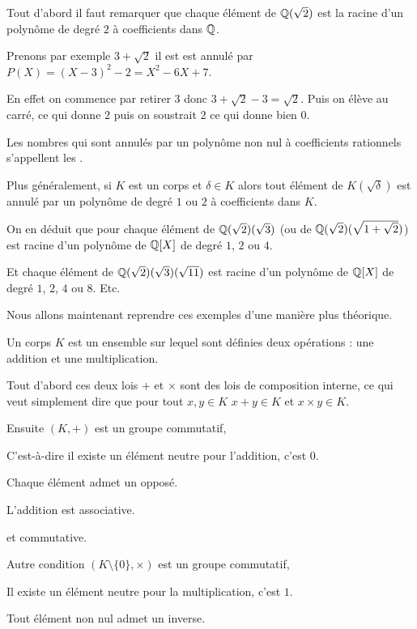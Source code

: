 \change
Tout d'abord il faut remarquer que chaque élément de $\mathbb{Q}(\sqrt 2)$ est la racine d'un polynôme de degré $2$
à coefficients dans $\mathbb{Q}$. 

\change
Prenons par exemple $3+\sqrt 2$ il est est annulé par 
$P(X) = (X-3)^2 -2 = X^2-6X+7$.

En effet on commence par retirer $3$ donc $3+\sqrt 2-3 = \sqrt 2$.
Puis on élève au carré, ce qui donne $2$ puis on soustrait $2$ ce qui donne bien $0$.

\change
Les nombres qui sont annulés par un polynôme non nul à coefficients rationnels s'appellent 
les 
.

\change
Plus généralement, si $K$ est un corps et $\delta \in K$ alors tout élément de $K(\sqrt \delta)$
est annulé par un polynôme de degré $1$ ou $2$ à coefficients dans $K$.

\change
On en déduit que pour chaque élément de $\mathbb{Q}(\sqrt2)(\sqrt 3)$ (ou de $\mathbb{Q}(\sqrt2)(\sqrt{1+\sqrt2})$)
est racine d'un polynôme de $\mathbb{Q}[X]$ de degré $1$, $2$ ou $4$.

\change
Et chaque élément de $\mathbb{Q}(\sqrt2)(\sqrt 3)(\sqrt {11})$ est racine d'un polynôme 
de $\mathbb{Q}[X]$ de degré $1$, $2$, $4$ ou $8$. Etc.


\diapo

Nous allons maintenant reprendre ces exemples d'une manière plus théorique.


Un corps $K$ est un ensemble sur lequel sont définies deux opérations : une addition et une multiplication.

\change
Tout d'abord ces deux lois $+$ et $\times$ sont des lois de composition interne, ce qui veut simplement dire que 
pour tout $x,y \in K$ $x+y \in K$ et $x\times y \in K$.

\change
Ensuite $(K,+)$ est un groupe commutatif,

\change
C'est-à-dire il existe un élément neutre pour l'addition, c'est $0$.

Chaque élément admet un opposé.

L'addition est associative.

et commutative.

\change
Autre condition $(K\setminus\{0\},\times)$ est un groupe commutatif, 

\change
Il existe un élément neutre pour la multiplication, c'est $1$.

Tout élément non nul admet un inverse.

